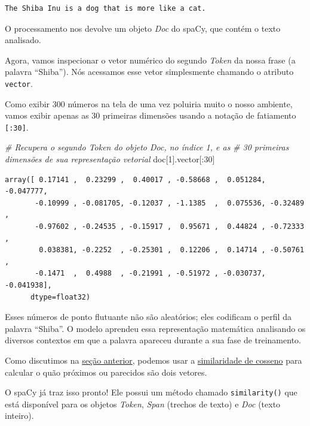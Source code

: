 \documentclass[
  brazilian,
]{article}
\newenvironment{Shaded}{}{}
\newcommand{\CommentTok}[1]{\textcolor[rgb]{0.38,0.63,0.69}{\textit{#1}}}
\newcommand{\DecValTok}[1]{\textcolor[rgb]{0.25,0.63,0.44}{#1}}
\newcommand{\NormalTok}[1]{#1}
\begin{document}
\begin{verbatim}
The Shiba Inu is a dog that is more like a cat.
\end{verbatim}

O processamento nos devolve um objeto \emph{Doc} do spaCy, que contém o
texto analisado.

Agora, vamos inspecionar o vetor numérico do segundo \emph{Token} da
nossa frase (a palavra ``Shiba''). Nós acessamos esse vetor simplesmente
chamando o atributo \texttt{vector}.

Como exibir 300 números na tela de uma vez poluiria muito o nosso
ambiente, vamos exibir apenas as 30 primeiras dimensões usando a notação
de fatiamento \texttt{{[}:30{]}}.

\begin{Shaded}
\begin{Highlighting}[]
\CommentTok{\# Recupera o segundo Token do objeto Doc, no índice 1, e as}
\CommentTok{\# 30 primeiras dimensões de sua representação vetorial}
\NormalTok{doc[}\DecValTok{1}\NormalTok{].vector[:}\DecValTok{30}\NormalTok{]}
\end{Highlighting}
\end{Shaded}

\begin{verbatim}
array([ 0.17141 ,  0.23299 ,  0.40017 , -0.58668 ,  0.051284, -0.047777,
       -0.10999 , -0.081705, -0.12037 , -1.1385  ,  0.075536, -0.32489 ,
       -0.97602 , -0.24535 , -0.15917 ,  0.95671 ,  0.44824 , -0.72333 ,
        0.038381, -0.2252  , -0.25301 ,  0.12206 ,  0.14714 , -0.50761 ,
       -0.1471  ,  0.4988  , -0.21991 , -0.51972 , -0.030737, -0.041938],
      dtype=float32)
\end{verbatim}

Esses números de ponto flutuante não são aleatórios; eles codificam o
perfil da palavra ``Shiba''. O modelo aprendeu essa representação
matemática analisando os diversos contextos em que a palavra apareceu
durante a sua fase de treinamento.

Como discutimos na
\href{../unidade_4/introducao_word_embeddings.html}{seção anterior},
podemos usar a
\href{https://pt.wikipedia.org/wiki/Similaridade_por_cosseno}{similaridade
de cosseno} para calcular o quão próximos ou parecidos são dois vetores.

O spaCy já traz isso pronto! Ele possui um método chamado
\texttt{similarity()} que está disponível para os objetos \emph{Token},
\emph{Span} (trechos de texto) e \emph{Doc} (texto inteiro).
\end{document}
